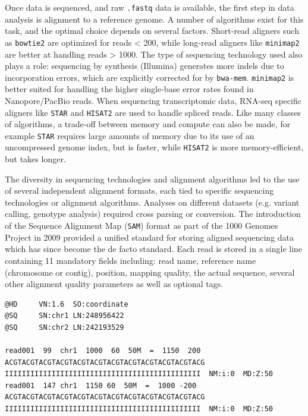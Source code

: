Once data is sequenced, and raw \verb|.fastq| data is available, the first step in data analysis is alignment to a reference genome. A number of algorithms exist for this task, and the optimal choice depends on several factors. Short-read aligners such as \verb|bowtie2| are optimized for reads < \SI{200}{\bp}, while long-read aligners like \verb|minimap2| are better at handling reads > \SI{1000}{\bp}. The type of sequencing technology used also plays a role: sequencing by synthesis (Illumina) generates more indels due to incorporation errors, which are explicitly corrected for by \verb|bwa-mem|. \verb|minimap2| is better suited for handling the higher single-base error rates found in Nanopore/PacBio reads. When sequencing transcriptomic data, RNA-seq specific aligners like \verb|STAR| and \verb|HISAT2| are used to handle spliced reads. Like many classes of algorithms, a trade-off between memory and compute can also be made, for example \verb|STAR| requires large amounts of memory due to its use of an uncompressed genome index, but is faster, while \verb|HISAT2| is more memory-efficient, but takes longer.

The diversity in sequencing technologies and alignment algorithms led to the use of several independent alignment formats, each tied to specific sequencing technologies or alignment algorithms. Analyses on different datasets (e.g. variant calling, genotype analysis) required cross parsing or conversion. The introduction of the Sequence Alignment Map (\verb|SAM|) format as part of the 1000 Genomes Project in 2009 provided a unified standard for storing aligned sequencing data which has since become the de facto standard. Each read is stored in a single line containing 11 mandatory fields including: read name, reference name (chromosome or contig), position, mapping quality, the actual sequence, several other alignment quality parameters as well as optional tags.

\begin{lstlisting}
@HD     VN:1.6  SO:coordinate
@SQ     SN:chr1 LN:248956422
@SQ     SN:chr2 LN:242193529

read001  99  chr1  1000  60  50M  =  1150  200  ACGTACGTACGTACGTACGTACGTACGTACGTACGTACGTACGTACG  IIIIIIIIIIIIIIIIIIIIIIIIIIIIIIIIIIIIIIIIIIIIII  NM:i:0  MD:Z:50
read001  147 chr1  1150 60  50M  =  1000 -200 ACGTACGTACGTACGTACGTACGTACGTACGTACGTACGTACGTACG  IIIIIIIIIIIIIIIIIIIIIIIIIIIIIIIIIIIIIIIIIIIIII  NM:i:0  MD:Z:50
\end{lstlisting}

